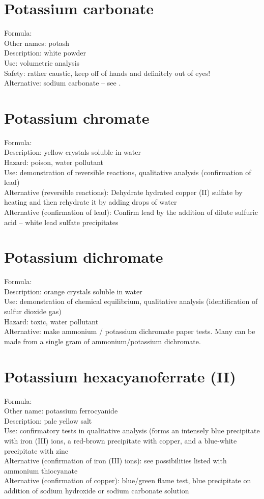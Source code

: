 \section{Potassium carbonate}
Formula: \\
Other names: potash\\
Description: white powder\\
Use: volumetric analysis\\
Safety: rather caustic, keep off of hands and definitely out of eyes!\\
Alternative: sodium carbonate -- 
see .

\section{Potassium chromate}
Formula: \\
Description: yellow crystals soluble in water\\
Hazard: poison, 
water pollutant\\
Use: demonstration of reversible reactions, 
qualitative analysis (confirmation of lead)\\
Alternative (reversible reactions):
Dehydrate hydrated copper (II) sulfate by heating 
and then rehydrate it by adding drops of water\\
Alternative (confirmation of lead): 
Confirm lead by the addition of dilute sulfuric acid -- 
white lead sulfate precipitates

\section{Potassium dichromate}
Formula: \\
Description: orange crystals soluble in water\\
Use: demonstration of chemical equilibrium, 
qualitative analysis (identification of sulfur dioxide gas)\\
Hazard: toxic, 
water pollutant\\
Alternative: make ammonium / potassium dichromate paper tests. 
Many can be made from a single gram of ammonium/potassium dichromate.

\section{Potassium hexacyanoferrate (II)}
Formula: \\
Other name: potassium ferrocyanide\\
Description: pale yellow salt\\
Use: confirmatory tests in qualitative analysis 
(forms an intensely blue precipitate with iron (III) ions, 
a red-brown precipitate with copper, 
and a blue-white precipitate with zinc\\
Alternative (confirmation of iron (III) ions): 
see possibilities listed with ammonium thiocyanate\\
Alternative (confirmation of copper): blue/green flame test, 
blue precipitate on addition of sodium hydroxide 
or sodium carbonate solution

